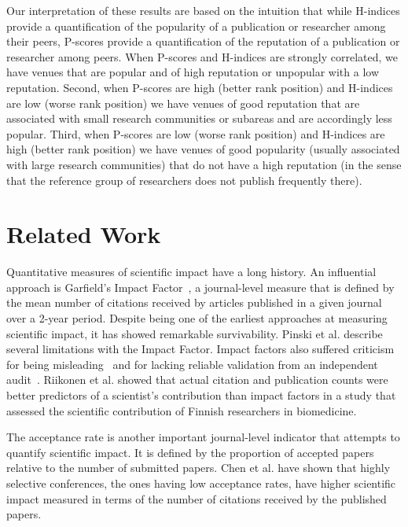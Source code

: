 \documentclass[notitlepage]{svjour3}
\begin{document}
Our interpretation of these results are based on the intuition that while H-indices provide a 
quantification of the popularity of a publication or researcher among their peers, P-scores 
provide a quantification of the reputation of a publication or researcher among peers. When
P-scores and H-indices are strongly correlated, we have venues that are popular and of high
reputation or unpopular with a low reputation. Second, when P-scores are high (better rank position) 
and H-indices are low (worse rank position) we have venues of good reputation
that are associated with small research communities or subareas and are accordingly less popular. Third, when P-scores
are low (worse rank position) and H-indices are high (better rank position) we have venues of good popularity 
(usually associated with large research communities) that do not have
a high reputation (in the sense that the reference group of researchers does not publish frequently there).

\section{Related Work}\label{sec:related-work}

Quantitative measures of scientific impact have a long history. An influential approach is
Garfield's Impact Factor~\cite{Garfield1955a}, a journal-level measure that is defined
by the mean number of citations received by articles published in a given journal over a 2-year period. 
Despite being one of the earliest approaches at measuring scientific impact, it has showed remarkable 
survivability. 
Pinski et al. \cite{Pinski1976} describe several limitations with the Impact Factor. Impact factors also suffered 
criticism for being misleading~\cite{Nature2016,Saha2003} and for lacking reliable validation from an independent 
audit~\cite{Rossner2007}. Riikonen et al. \cite{Riikonen2008} showed that actual citation 
and publication counts were better predictors of a scientist's contribution than impact factors in a 
study that assessed the scientific contribution of Finnish researchers in biomedicine.

The acceptance rate is another important journal-level indicator that attempts to quantify scientific impact. It
is defined by the proportion of accepted papers relative to the number of submitted papers. Chen et al. \cite{Chen2010} 
have shown that highly selective conferences, the ones having low acceptance rates, have higher 
scientific impact measured in terms of the number of citations received by the published papers.
\end{document}

